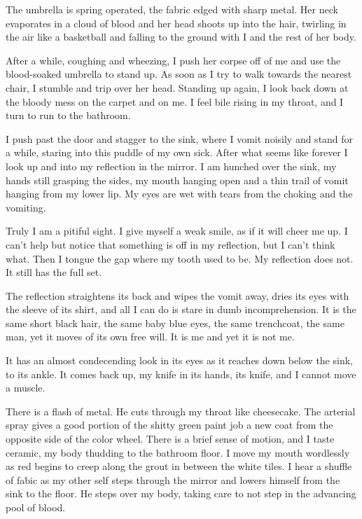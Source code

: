 The umbrella is spring operated, the fabric edged with sharp metal.
Her neck evaporates in a cloud of blood and her head shoots up into
the hair, twirling in the air like a basketball and falling to the
ground with I and the rest of her body.



After a while, coughing and wheezing, I push her corpse off of me
and use the blood-soaked umbrella to stand up. As soon as I try to
walk towards the nearest chair, I stumble and trip over her head.
Standing up again, I look back down at the bloody mess on the
carpet and on me. I feel bile rising in my throat, and I turn to
run to the bathroom.



I push past the door and stagger to the sink, where I vomit noisily
and stand for a while, staring into this puddle of my own sick.
After what seems like forever I look up and into my reflection in
the mirror. I am hunched over the sink, my hands still grasping the
sides, my mouth hanging open and a thin trail of vomit hanging from
my lower lip. My eyes are wet with tears from the choking and the
vomiting.



Truly I am a pitiful sight. I give myself a weak smile, as if it
will cheer me up. I can't help but notice that something is off in
my reflection, but I can't think what. Then I tongue the gap where
my tooth used to be. My reflection does not. It still has the full
set.



The reflection straightens its back and wipes the vomit away, dries
its eyes with the sleeve of its shirt, and all I can do is stare in
dumb incomprehension. It is the same short black hair, the same
baby blue eyes, the same trenchcoat, the same man, yet it moves of
its own free will. It is me and yet it is not me.



It has an almost condecending look in its eyes as it reaches down
below the sink, to its ankle. It comes back up, my knife in its
hands, its knife, and I cannot move a muscle.



There is a flash of metal. He cuts through my throat like
cheesecake. The arterial spray gives a good portion of the shitty
green paint job a new coat from the opposite side of the color
wheel. There is a brief sense of motion, and I taste ceramic, my
body thudding to the bathroom floor. I move my mouth wordlessly as
red begins to creep along the grout in between the white tiles. I
hear a shuffle of fabic as my other self steps through the mirror
and lowers himself from the sink to the floor. He steps over my
body, taking care to not step in the advancing pool of blood.



